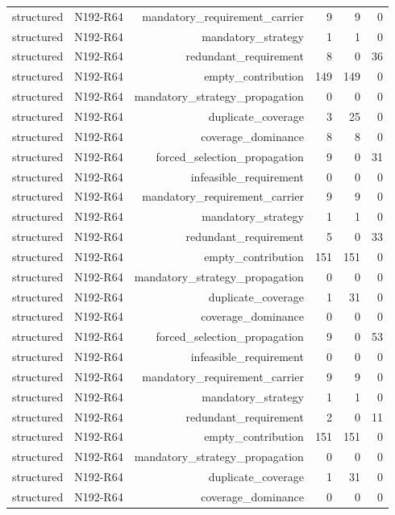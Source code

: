 {\begin{longtable}{lrrrrr}
structured & N192-R64 & mandatory\_requirement\_carrier & 9 & 9 & 0 \\
structured & N192-R64 & mandatory\_strategy & 1 & 1 & 0 \\
structured & N192-R64 & redundant\_requirement & 8 & 0 & 36 \\
structured & N192-R64 & empty\_contribution & 149 & 149 & 0 \\
structured & N192-R64 & mandatory\_strategy\_propagation & 0 & 0 & 0 \\
structured & N192-R64 & duplicate\_coverage & 3 & 25 & 0 \\
structured & N192-R64 & coverage\_dominance & 8 & 8 & 0 \\
structured & N192-R64 & forced\_selection\_propagation & 9 & 0 & 31 \\
structured & N192-R64 & infeasible\_requirement & 0 & 0 & 0 \\
structured & N192-R64 & mandatory\_requirement\_carrier & 9 & 9 & 0 \\
structured & N192-R64 & mandatory\_strategy & 1 & 1 & 0 \\
structured & N192-R64 & redundant\_requirement & 5 & 0 & 33 \\
structured & N192-R64 & empty\_contribution & 151 & 151 & 0 \\
structured & N192-R64 & mandatory\_strategy\_propagation & 0 & 0 & 0 \\
structured & N192-R64 & duplicate\_coverage & 1 & 31 & 0 \\
structured & N192-R64 & coverage\_dominance & 0 & 0 & 0 \\
structured & N192-R64 & forced\_selection\_propagation & 9 & 0 & 53 \\
structured & N192-R64 & infeasible\_requirement & 0 & 0 & 0 \\
structured & N192-R64 & mandatory\_requirement\_carrier & 9 & 9 & 0 \\
structured & N192-R64 & mandatory\_strategy & 1 & 1 & 0 \\
structured & N192-R64 & redundant\_requirement & 2 & 0 & 11 \\
structured & N192-R64 & empty\_contribution & 151 & 151 & 0 \\
structured & N192-R64 & mandatory\_strategy\_propagation & 0 & 0 & 0 \\
structured & N192-R64 & duplicate\_coverage & 1 & 31 & 0 \\
structured & N192-R64 & coverage\_dominance & 0 & 0 & 0 \\

\end{longtable}}
